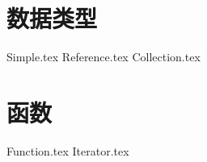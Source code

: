 \documentclass{PionpillNote-book}
\begin{document}
\chapter{数据类型}
{Simple.tex}
{Reference.tex}
{Collection.tex}
\chapter{函数}
{Function.tex}
{Iterator.tex}
\end{document}

